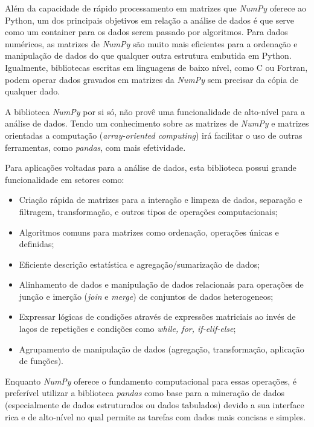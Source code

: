 Além da capacidade de rápido processamento em matrizes que \textit{NumPy} oferece ao Python, um dos principais objetivos em relação a análise de dados é que serve como um container para os dados serem passado por algoritmos. Para dados numéricos, as matrizes de \textit{NumPy} são muito mais eficientes para a ordenação e manipulação de dados do que qualquer outra estrutura embutida em Python. Igualmente, bibliotecas escritas em linguagens de baixo nível, como C ou Fortran, podem operar dados gravados em matrizes da \textit{NumPy} sem precisar da cópia de qualquer dado. \cite{python-analysis}

A biblioteca \textit{NumPy} por si só, não provê uma funcionalidade de alto-nível para a análise de dados. Tendo um conhecimento sobre as matrizes de \textit{NumPy} e matrizes orientadas a computação (\textit{array-oriented computing}) irá facilitar o uso de outras ferramentas, como \textit{pandas}, com mais efetividade.

Para aplicações voltadas para a análise de dados, esta biblioteca possui grande funcionalidade em setores como:

\begin{itemize}
    \item Criação rápida de matrizes para a interação e limpeza de dados, separação e filtragem, transformação, e outros tipos de operações computacionais;
    \item Algoritmos comuns para matrizes como ordenação, operações únicas e definidas;
    \item Eficiente descrição estatística e agregação/sumarização de dados;
    \item Alinhamento de dados e manipulação de dados relacionais para operações de junção e imerção (\textit{join} e \textit{merge}) de conjuntos de dados heterogeneos;
    \item Expressar lógicas de condições através de expressões matriciais ao invés de laços de repetições e condições como \textit{while, for, if-elif-else};
    \item Agrupamento de manipulação de dados (agregação, transformação, aplicação de funções).
\end{itemize}

Enquanto \textit{NumPy} oferece o fundamento computacional para essas operações, é preferível utilizar a biblioteca \textit{pandas} como base para a mineração de dados (especialmente de dados estruturados ou dados tabulados) devido a sua interface rica e de alto-nível no qual permite as tarefas com dados mais concisas e simples.

